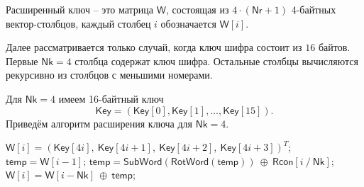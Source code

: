 Расширенный ключ -- это матрица $\mathsf{W}$, состоящая из $4 \cdot (\mathsf{Nr} + 1)$ 4-байтных вектор-столбцов, каждый столбец $i$ обозначается $\mathsf{W}[i]$.

Далее рассматривается только случай, когда ключ шифра состоит из $16$ байтов. Первые $\mathsf{Nk} = 4$ столбца содержат ключ шифра. Остальные столбцы вычисляются рекурсивно из столбцов с меньшими номерами.

Для $\mathsf{Nk} = 4$ имеем 16-байтный ключ
\[
    \mathsf{Key} = (\mathsf{Key}[0], \mathsf{Key}[1], \dots, \mathsf{Key}[15]).
\]
Приведём алгоритм расширения ключа для $\mathsf{Nk} = 4$.
\begin{algorithm}[ht]
    \caption{$\mathsf{KeyExpansion}(\mathsf{Key}, \mathsf{W})$\label{alg:AES-key-exp}}
    \begin{algorithmic}
            \STATE $\mathsf{W}[i] = (\mathsf{Key}[4i], ~ \mathsf{Key}[4i+1], ~ \mathsf{Key}[4i+2], ~ \mathsf{Key}[4i+3])^T$;
        \ENDFOR
            \STATE $\mathsf{temp} = \mathsf{W}[i-1]$;
                \STATE $\mathsf{temp} = \mathsf{SubWord}(\mathsf{RotWord}(\mathsf{temp})) ~ \oplus ~ \mathsf{Rcon}[i ~/~ \mathsf{Nk}]$;
            \ENDIF
            \STATE $\mathsf{W}[i] = \mathsf{W}[i - \mathsf{Nk}] ~ \oplus ~ \mathsf{temp}$;
        \ENDFOR
    \end{algorithmic}
\end{algorithm}



